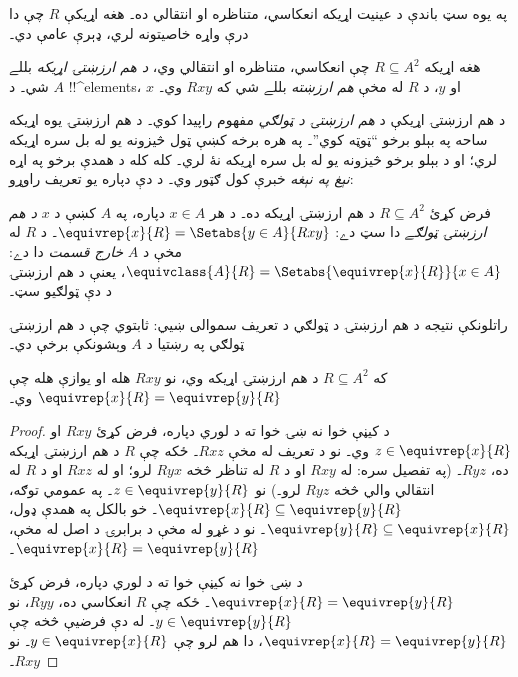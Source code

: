 \documentclass[../../../include/open-logic-section]{subfiles}
\begin{document}


په يوه سټ باندې د عينيت اړيکه انعکاسي، متناظره او انتقالي ده۔
هغه اړيکې $R$ چې دا درې واړه خاصيتونه لري، ډېرې عامې دي۔

\begin{defn}
هغه اړيکه $R \subseteq A^2$ چې انعکاسي، متناظره او انتقالي وي،
\emph{د هم ارزښتۍ اړيکه} بللے شي۔ د $A$ !!^{element}s، $x$ او
$y$، د $R$ له مخې \emph{هم ارزښته} بللے شي که $Rxy$ وي۔
\end{defn}

د هم ارزښتۍ اړيکې د \emph{هم ارزښتۍ د ټولګي} مفهوم راپيدا کوي۔
د هم ارزښتۍ يوه اړيکه ساحه په بېلو برخو ``ټوټه کوي''۔ په هره برخه
کښې ټول څيزونه يو له بل سره اړيکه لري؛ او د بېلو برخو څيزونه يو
له بل سره اړيکه نۀ لري۔ کله کله د همدې برخو په اړه \emph{نېغ په نېغه}
خبرې کول ګټور وي۔ د دې دپاره يو تعريف راوړو:

\begin{defn}
فرض کړئ $R \subseteq A^2$ د هم ارزښتۍ اړيکه ده۔ د هر $x \in A$
دپاره، په $A$ کښې د $x$ \emph{د هم ارزښتۍ ټولګے} دا سټ دے:
$\equivrep{x}{R} = \Setabs{y \in A}{Rxy}$۔ د $R$ له مخې د $A$
\emph{خارج قسمت} دا دے:
$\equivclass{A}{R} = \Setabs{\equivrep{x}{R}}{x \in A}$، يعنې
د هم ارزښتۍ د دې ټولګيو سټ۔
\end{defn}

راتلونکې نتيجه د هم ارزښتۍ د ټولګي د تعريف سموالى ښيي: ثابتوي چې
د هم ارزښتۍ ټولګي په رښتيا د $A$ وېشونکې برخې دي۔

\begin{prop}
که $R \subseteq A^2$ د هم ارزښتۍ اړيکه وي، نو $Rxy$ هله او يوازې
هله چې $\equivrep{x}{R} = \equivrep{y}{R}$ وي۔
\end{prop}

\begin{proof}
د کيڼې خوا نه ښۍ خوا ته د لوري دپاره، فرض کړئ $Rxy$ او
$z \in \equivrep{x}{R}$ وي۔ نو د تعريف له مخې $Rxz$۔ ځکه چې $R$
د هم ارزښتۍ اړيکه ده، $Ryz$۔ (په تفصيل سره: له $Rxy$ او د $R$
له تناظر څخه $Ryx$ لرو؛ او له $Rxz$ او د $R$ له انتقالي والي څخه
$Ryz$ لرو۔) نو $z \in \equivrep{y}{R}$۔ په عمومي توګه،
$\equivrep{x}{R} \subseteq \equivrep{y}{R}$۔ خو بالکل په همدې
ډول، $\equivrep{y}{R} \subseteq \equivrep{x}{R}$۔ نو د غړو له
مخې د برابرۍ د اصل له مخې، $\equivrep{x}{R} = \equivrep{y}{R}$۔

د ښۍ خوا نه کيڼې خوا ته د لوري دپاره، فرض کړئ
$\equivrep{x}{R} = \equivrep{y}{R}$۔ ځکه چې $R$ انعکاسي ده،
$Ryy$، نو $y \in \equivrep{y}{R}$۔ له دې فرضيې څخه چې
$\equivrep{x}{R} = \equivrep{y}{R}$، دا هم لرو چې
$y \in \equivrep{x}{R}$۔ نو $Rxy$۔
\end{proof}
\end{document}
